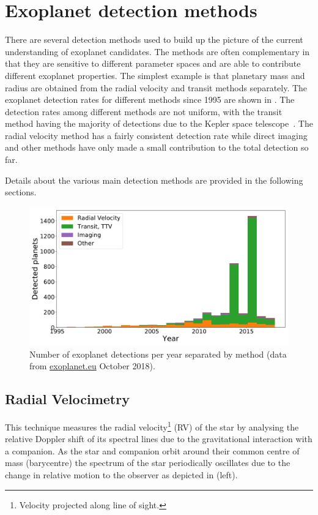 

\section{Exoplanet detection methods}
\label{sec:detection_methods}
There are several detection methods used to build up the picture of the current understanding of exoplanet candidates.
The methods are often complementary in that they are sensitive to different parameter spaces and are able to contribute different exoplanet properties.
The simplest example is that planetary mass and radius are obtained from the radial velocity and transit methods separately.
The exoplanet detection rates for different methods since 1995 are shown in .
The detection rates among different methods are not uniform, with the transit method having the majority of detections due to the Kepler space telescope~\citep{borucki_finding_2008}.
The radial velocity method has a fairly consistent detection rate while direct imaging and other methods have only made a small contribution to the total detection so far.

Details about the various main detection methods are provided in the following sections.

\begin{figure}
    \centering
    \includegraphics[width=0.7\linewidth]{./figures/introduction/exoplanetEU_year_method.pdf}
    \caption{Number of exoplanet detections per year separated by method (data from \href{http://ww.exoplanet.eu}{exoplanet.eu} October 2018).}
    \label{fig:detection_year_method}
\end{figure}

\subsection{Radial Velocimetry}
\label{sub:radial_velocimetry}
This technique measures the radial velocity\footnote{Velocity projected along line of sight.} (RV) of the star by analysing the relative Doppler shift of its spectral lines due to the gravitational interaction with a companion.
As the star and companion orbit around their common centre of mass (barycentre) the spectrum of the star periodically oscillates due to the change in relative motion to the observer as depicted in  (left).

